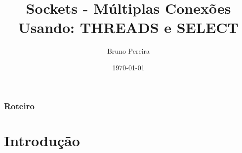 \documentclass[10pt, xcolor=x11names]{beamer}
\title[Sockets - Múltiplas Conexões]{Sockets - Múltiplas Conexões \\ Usando: THREADS e SELECT} %
\author[Bruno P. Santos]{Bruno Pereira}%
\institute[ UFMG ]%
{
Universidade Federal de Minas Gerais \\ %
\medskip
\textit{bruno.ps@live.com} %
}
\date{\today} %
\begin{document}
\begin{frame}
\titlepage %
\end{frame}


\begin{frame}
\frametitle{Roteiro} %
\tableofcontents %
\end{frame}


\section{Introdução} %
\end{document}
